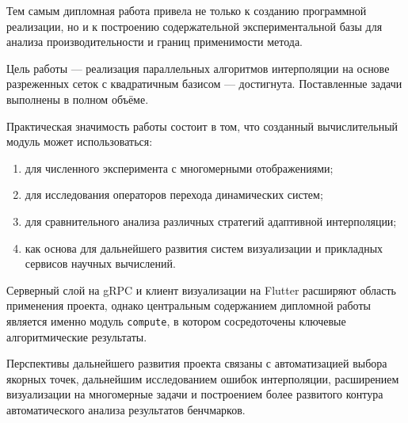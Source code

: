 Тем самым дипломная работа привела не только к созданию программной реализации, но и к построению содержательной экспериментальной базы для анализа производительности и границ применимости метода.

Цель работы --- реализация параллельных алгоритмов интерполяции на основе разреженных сеток с квадратичным базисом --- достигнута. Поставленные задачи выполнены в полном объёме.

Практическая значимость работы состоит в том, что созданный вычислительный модуль может использоваться:
\begin{enumerate}
    \item для численного эксперимента с многомерными отображениями;
    \item для исследования операторов перехода динамических систем;
    \item для сравнительного анализа различных стратегий адаптивной интерполяции;
    \item как основа для дальнейшего развития систем визуализации и прикладных сервисов научных вычислений.
\end{enumerate}

Серверный слой на gRPC и клиент визуализации на Flutter расширяют область применения проекта, однако центральным содержанием дипломной работы является именно модуль \texttt{compute}, в котором сосредоточены ключевые алгоритмические результаты.

Перспективы дальнейшего развития проекта связаны с автоматизацией выбора якорных точек, дальнейшим исследованием ошибок интерполяции, расширением визуализации на многомерные задачи и построением более развитого контура автоматического анализа результатов бенчмарков.